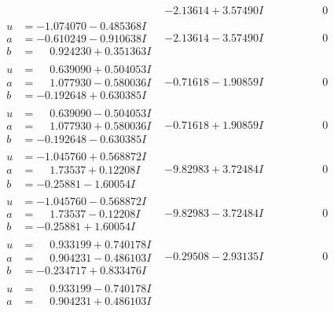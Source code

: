 \documentclass[1p]{elsarticle_modified}
\theoremstyle{definition}
\begin{document}
$$\begin{array}{c|c|c}
 & -2.13614 + 3.57490 I & \phantom{-0.000000 } 0 \\ \hline\begin{aligned}
u &= -1.074070 - 0.485368 I \\
a &= -0.610249 - 0.910638 I \\
b &= \phantom{-}0.924230 + 0.351363 I\end{aligned}
 & -2.13614 - 3.57490 I & \phantom{-0.000000 } 0 \\ \hline\begin{aligned}
u &= \phantom{-}0.639090 + 0.504053 I \\
a &= \phantom{-}1.077930 - 0.580036 I \\
b &= -0.192648 + 0.630385 I\end{aligned}
 & -0.71618 - 1.90859 I & \phantom{-0.000000 } 0 \\ \hline\begin{aligned}
u &= \phantom{-}0.639090 - 0.504053 I \\
a &= \phantom{-}1.077930 + 0.580036 I \\
b &= -0.192648 - 0.630385 I\end{aligned}
 & -0.71618 + 1.90859 I & \phantom{-0.000000 } 0 \\ \hline\begin{aligned}
u &= -1.045760 + 0.568872 I \\
a &= \phantom{-}1.73537 + 0.12208 I \\
b &= -0.25881 - 1.60054 I\end{aligned}
 & -9.82983 + 3.72484 I & \phantom{-0.000000 } 0 \\ \hline\begin{aligned}
u &= -1.045760 - 0.568872 I \\
a &= \phantom{-}1.73537 - 0.12208 I \\
b &= -0.25881 + 1.60054 I\end{aligned}
 & -9.82983 - 3.72484 I & \phantom{-0.000000 } 0 \\ \hline\begin{aligned}
u &= \phantom{-}0.933199 + 0.740178 I \\
a &= \phantom{-}0.904231 - 0.486103 I \\
b &= -0.234717 + 0.833476 I\end{aligned}
 & -0.29508 - 2.93135 I & \phantom{-0.000000 } 0 \\ \hline\begin{aligned}
u &= \phantom{-}0.933199 - 0.740178 I \\
a &= \phantom{-}0.904231 + 0.486103 I \\

\end{aligned}
\end{array}$$
\end{document}
